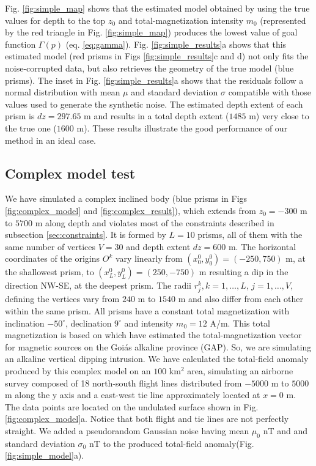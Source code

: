Fig. \ref{fig:simple_map} shows that the estimated model obtained by using the true values for depth to the top $ z_0 $ and total-magnetization intensity $ m_0 $ (represented by the red triangle in Fig. \ref{fig:simple_map}) produces the lowest value of goal function  $ \Gamma(p) $ (eq. \ref{eq:gamma}). Fig. \ref{fig:simple_results}a shows that this estimated model (red prisms in Figs \ref{fig:simple_results}c and d) not only fits the noise-corrupted data, but also retrieves the geometry of the true model (blue prisms). The inset in Fig. \ref{fig:simple_results}a shows that the residuals follow a normal distribution with mean $ \mu $ and standard deviation $ \sigma $ compatible with those values used to generate 
the synthetic noise. The estimated depth extent of each prism is $ dz = 297.65 $ m and  results in a total depth extent ($ 1485$ m) very close to the true one ($ 1600 $ m). 
These results illustrate the good performance of our method in an ideal case.

\subsection{Complex model test}

We have simulated a complex inclined body (blue prisms in Figs \ref{fig:complex_model} and \ref{fig:complex_result}), which extends from $z_0=-300$ m to $5700$ m along depth and violates most of the constraints described in subsection \ref{sec:constraints}. It is formed by $ L = 10 $ prisms, all of them with the same number of vertices $ V = 30 $ and depth extent $ dz = 600 $ m. The horizontal coordinates of the origins $ O^k $ vary linearly from $ (x_0^0, y_0^0) = (-250, 750) $ m, at the shallowest prism, to $ (x_L^0, y_L^0) = (250, -750) $ m resulting a dip in the direction NW-SE, at the deepest prism. The radii $ r^k_j, k = 1, \dots, L$, $j = 1,\dots, V$, defining the vertices vary from $ 240 $ m to $ 1540 $ m and also differ from each other within the same prism. All prisms have a constant total magnetization with inclination $ -50^\circ $, declination $ 9^\circ $ and intensity $ m_0 = 12 $ A/m. This total magnetization is based on \cite{zhang-2018} which have estimated the total-magnetization vector for magnetic sources on the Goiás alkaline province (GAP). So, we are simulating an alkaline vertical dipping intrusion. We have calculated the total-field anomaly produced by this complex model on an $ 100 $ km$^2 $ area, simulating an airborne survey composed of 18 north-south flight lines distributed from $ -5000 $ m to $ 5000 $ m along the y axis and a east-west tie line approximately located at $ x = 0 $ m. The data points are located on the undulated surface shown in Fig. \ref{fig:complex_model}a. Notice that both flight and tie lines are not perfectly straight. We added a pseudorandom Gaussian noise having mean $ \mu_0$ nT and and standard deviation $ \sigma_0$ nT to the produced total-field anomaly(Fig. \ref{fig:simple_model}a).

